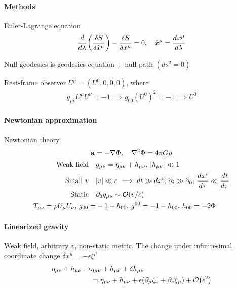 \documentclass[main]{subfiles}
\begin{document}
\paragraph{Methods}
\begin{multicols}{2}
Euler-Lagrange equation
    \begin{align}
        \dv{}{\lambda}\qty(\fdv{S}{\dot{x}^\mu}) - \fdv{S}{x^\mu} = 0,\quad \dot{x}^\mu = \dv{x^\mu}{\lambda}
    \end{align}

Null geodesics is geodesics equation + null path $(ds^2=0)$

Rest-frame observer $U^\mu = (U^0, 0, 0, 0)$, where
    \begin{align}
        g_{\mu\nu} U^\mu U^\nu = -1 \implies g_{00}(U^0)^2 = -1 \implies U^0
    \end{align}

\paragraph{Newtonian approximation}
Newtonian theory $$\vb{a} = -\nabla \Phi ,\quad \nabla^2\Phi = 4\pi G\rho$$
\begin{align}
    \qq{Weak field}& g_{\mu\nu} = \eta_{\mu\nu} + h_{\mu\nu},\, |h_{\mu\nu}| \ll 1
    \\
    \qq{Small $v$}& |v|\ll c \implies dt \gg dx^i,\,
    \partial_i \gg \partial_0,\,
    \dv{x^i}{\tau} \ll \dv{t}{\tau}\notag
    \\
    \qq{Static}& \partial_0 g_{\mu\nu} \sim \order{v/c}
    \\
    T_{\mu\nu} = \rho U_\mu U_\nu,\,
    g_{00} =& -1 + h_{00},\,
    g^{0
0} = -1 - h_{00},\,
    h_{00} = -2\Phi
    \notag
\end{align}

\paragraph{Linearized gravity} Weak field, arbitrary $v$, non-static metric. The change under infinitesimal coordinate change $\delta x^\mu = -\epsilon\xi^\mu$
\begin{align}
    \eta_{\mu\nu} + h_{\mu\nu} \rightarrow & \eta_{\mu\nu} + h_{\mu\nu} + \delta h_{\mu\nu}
    \\
    &= \eta_{\mu\nu} + h_{\mu\nu} + \epsilon(\partial_\mu \xi_\nu + \partial_\nu \xi_\mu) + \order{\epsilon^2}
 \end{align}

\end{multicols}
\end{document}
